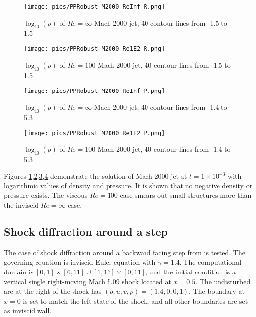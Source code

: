 \begin{figure}[htbp]
    \centering
    \texttt{[image: pics/PPRobust\_M2000\_ReInf\_R.png]}
    \caption{$\log_{10}(\rho)$ of $Re=\infty$ Mach 2000 jet, 40 contour lines from -1.5 to 1.5}
    \label{fig:M2000_ReInf_R}
\end{figure}

\begin{figure}[htbp]
    \centering
    \texttt{[image: pics/PPRobust\_M2000\_Re1E2\_R.png]}
    \caption{$\log_{10}(\rho)$ of $Re=100$ Mach 2000 jet, 40 contour lines from -1.5 to 1.5}
    \label{fig:M2000_Re1E2_R}
\end{figure}

\begin{figure}[htbp]
    \centering
    \texttt{[image: pics/PPRobust\_M2000\_ReInf\_P.png]}
    \caption{$\log_{10}(p)$ of $Re=\infty$ Mach 2000 jet, 40 contour lines from -1.4 to 5.3}
    \label{fig:M2000_ReInf_P}
\end{figure}

\begin{figure}[htbp]
    \centering
    \texttt{[image: pics/PPRobust\_M2000\_Re1E2\_P.png]}
    \caption{$\log_{10}(p)$ of $Re=100$ Mach 2000 jet, 40 contour lines from -1.4 to 5.3}
    \label{fig:M2000_Re1E2_P}
\end{figure}

Figures \ref{fig:M2000_ReInf_R},\ref{fig:M2000_Re1E2_R},\ref{fig:M2000_ReInf_P},\ref{fig:M2000_Re1E2_P}
demonstrate the solution of Mach 2000 jet at $t=1\times10^{-3}$ with 
logarithmic values of density and pressure. 
It is shown that no negative density or pressure exists.
The viscous $Re=100$ case smears out small structures more than 
the inviscid $Re=\infty$ case.


\subsection{Shock diffraction around a step}

The case of shock diffraction around a backward facing step 
from \cite{zhang2010positivity} is tested. 
The governing equation is inviscid Euler equation with $\gamma = 1.4$.
The computational domain is $[0,1]\times[6,11]\cup [1,13]\times[0,11]$,
and the initial condition is a vertical single right-moving Mach 5.09
shock located at $x=0.5$.
The undisturbed are at the right of the shock has $(\rho, u, v, p)=(1.4,0,0,1)$.
The boundary at $x=0$ is set to match the left state of the shock, and 
all other boundaries are set as inviscid wall.



